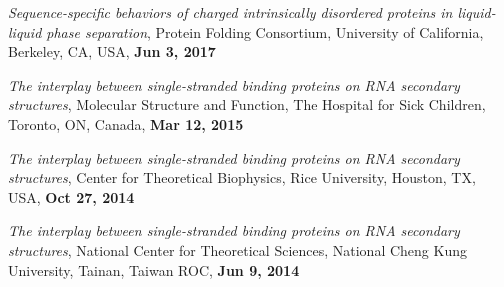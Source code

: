 \documentclass[11pt]{../yhlcv}
\begin{document}
\begin{etaremune}[leftmargin=0.26in]
\item {\it Sequence-specific behaviors of charged intrinsically disordered proteins
	in liquid-liquid phase separation}, Protein Folding Consortium, University of California, Berkeley, CA, USA, {\bf Jun 3, 2017}

\item {\it The interplay between single-stranded binding proteins on RNA secondary structures},
	Molecular Structure and Function, The Hospital for Sick Children, Toronto, ON, Canada, {\bf Mar 12, 2015}

\item {\it The interplay between single-stranded binding proteins on RNA secondary structures},
	Center for Theoretical Biophysics, Rice University, Houston, TX, USA, {\bf Oct 27, 2014}

\item {\it The interplay between single-stranded binding proteins on RNA secondary structures}, National Center for Theoretical Sciences, National Cheng Kung University, Tainan, Taiwan ROC, {\bf Jun 9, 2014}

\end{etaremune}
\end{document}
